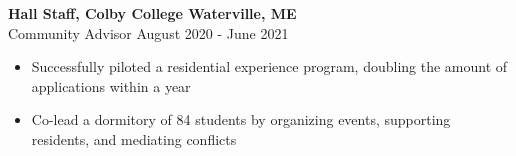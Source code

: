 \documentclass[letterpaper]{article}
\newcommand{\expheader}[4]{
    \vspace{2mm}
    \textbf{#1 \hfill #2}\\
    #3 \hfill #4\\
    \vspace{-3mm}
}
\begin{document}


\expheader{Hall Staff, Colby College}{Waterville, ME}{Community Advisor}{August
2020 - June 2021}
\begin{itemize} \itemsep 0pt
    \item Successfully piloted a residential experience program, doubling the
		amount of applications within a year
	\item Co-lead a dormitory of 84 students by organizing events, supporting residents, and mediating conflicts
\end{itemize}

\vspace{2mm}


\end{document}

